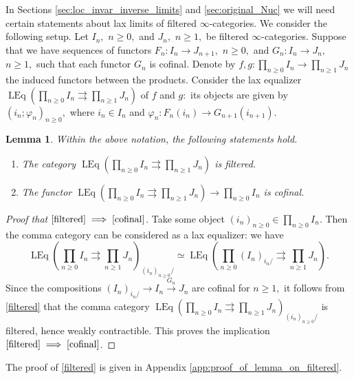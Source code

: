 \documentclass[11pt,leqno]{amsart}
\newcommand{\Implies}[2]{$\text{\ref{#1}}\implies\text{\ref{#2}}$}
\newtheorem{lemma}[theo]{Lemma}
\numberwithin{equation}{section}
\newcommand{\prodd}[1][]{\mathop{\prod}\limits_{#1}}
\newcommand{\toto}{\rightrightarrows}
\newcommand{\xto}{\xrightarrow}
\newcommand{\LEq}{\operatorname{LEq}}
\begin{document}
In Sections \ref{sec:loc_invar_inverse_limits} and \ref{sec:original_Nuc} we will need certain statements about lax limits of filtered $\infty$-categories. We consider the following setup. Let $I_n,$ $n\geq 0,$ and $J_n,$ $n\geq 1,$ be filtered $\infty$-categories. Suppose that we have sequences of functors $F_n:I_n\to J_{n+1},$ $n\geq 0,$ and $G_n:I_n\to J_n, $ $n\geq 1,$ such that each functor $G_n$ is cofinal. Denote by $f,g:\prodd[n\geq 0]I_n\to\prodd[n\geq 1]J_n$ the induced functors between the products. Consider the lax equalizer $\LEq(\prodd[n\geq 0]I_n\toto\prodd[n\geq 1]J_n)$ of $f$ and $g:$ its objects are given by $(i_n;\varphi_n)_{n\geq 0},$ where $i_n\in I_n$ and $\varphi_n:F_n(i_n)\to G_{n+1}(i_{n+1}).$

\begin{lemma}\label{lem:lax_equalizer_of_filtered_properties} Within the above notation, the following statements hold.
\begin{enumerate}[label=(\roman*),ref=(\roman*)]
\item The category $\LEq(\prodd[n\geq 0]I_n\toto\prodd[n\geq 1]J_n)$ is filtered. \label{filtered}

\item The functor $\LEq(\prodd[n\geq 0]I_n\toto\prodd[n\geq 1]J_n)\to\prodd[n\geq 0]I_n$ is cofinal. \label{cofinal}
\end{enumerate}
\end{lemma}

\begin{proof}[Proof that \Implies{filtered}{cofinal}]
Take some object $(i_n)_{n\geq 0}\in \prodd[n\geq 0]I_n.$ Then the comma category can be considered as a lax equalizer: we have
\begin{equation*}
	\LEq(\prodd[n\geq 0]I_n\toto\prodd[n\geq 1]J_n)_{(i_n)_{n\geq 0}/}\simeq \LEq(\prodd[n\geq 0](I_n)_{i_n/}\toto\prodd[n\geq 1]J_n).
\end{equation*} 
Since the compositions $(I_n)_{i_n/}\to I_n\xto{G_n}J_n$ are cofinal for $n\geq 1,$ it follows from \ref{filtered} that the comma category $\LEq(\prodd[n\geq 0]I_n\toto\prodd[n\geq 1]J_n)_{(i_n)_{n\geq 0}/}$ is filtered, hence weakly contractible. This proves the implication \Implies{filtered}{cofinal}.
\end{proof}

The proof of \ref{filtered} is given in Appendix \ref{app:proof_of_lemma_on_filtered}.
\end{document}
